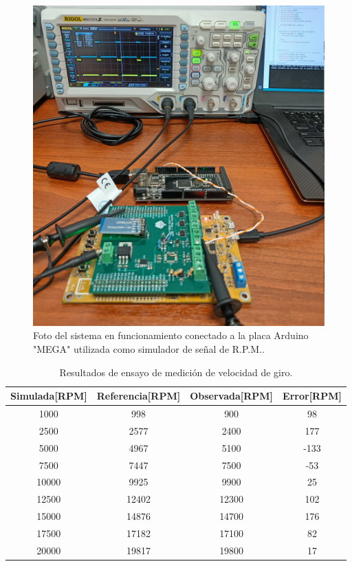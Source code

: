 \begin{figure}[htpb]
\centering
\includegraphics[width=.8\textwidth]{./Figures/foto-rpm.jpg}
\caption{Foto del sistema en funcionamiento conectado a la placa Arduino "MEGA" utilizada como simulador de señal de R.P.M..}
\label{fig:foto-rpm}
\end{figure}

\begin{table}[htpb]
	\centering
	\caption{Resultados de ensayo de medición de velocidad de giro.}
	\centering
	\begin{tabular}{c c c c}    
		\toprule
		\textbf{Simulada[RPM]} &  \textbf{Referencia[RPM]}   & \textbf{Observada[RPM]} & \textbf{Error[RPM]}\\
		\midrule
		1000	&	998 &	900 & 98\\
		2500	&	2577 & 2400 & 177\\
		5000	&	4967 & 5100 & -133 \\
		7500	&	7447 & 7500 & -53\\
		10000	&	9925 & 9900 & 25\\
		12500	&	12402 & 12300 & 102\\
		15000	&	14876 & 14700 & 176\\
		17500	&	17182 & 17100 & 82\\
		20000	&	19817 & 19800 & 17\\		
		\bottomrule
	\end{tabular}
	\label{tab:ensayo-rpm}
\end{table}

